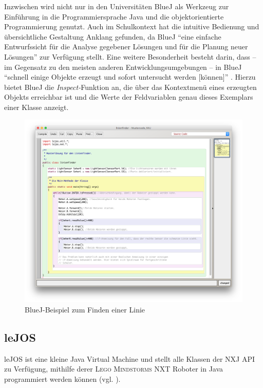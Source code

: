 \documentclass[paper=a4, DIV=calc, BCOR=12mm, twoside=on, onecolumn=on, open = right, titlepage =on, parskip =half-, headsepline = on, footsepline = off, chapterprefix = off, appendixprefix = on, fontsize = 12pt, numbers = noenddot, abstract = on]{scrbook}
\begin{document}
Inzwischen wird nicht nur in den Universitäten BlueJ als Werkzeug zur Einführung in die Programmiersprache Java und die objektorientierte Programmierung genutzt. Auch im Schulkontext hat die intuitive Bedienung und übersichtliche Gestaltung Anklang gefunden, da BlueJ "`eine einfache Entwurfssicht für die Analyse gegebener Lösungen und für die Planung neuer Lösungen"' \cite[S.6]{ehmann:09} zur Verfügung stellt. Eine weitere Besonderheit besteht darin, dass -- im Gegensatz zu den meisten anderen Entwicklungsumgebungen -- in BlueJ "`schnell einige Objekte erzeugt und sofort untersucht werden [können]"' \cite[S.6]{ehmann:09}. Hierzu bietet BlueJ die \emph{Inspect-}Funktion an, die über das Kontextmenü eines erzeugten Objekts erreichbar ist und die Werte der Feldvariablen genau dieses Exemplars einer Klasse anzeigt.

\begin{figure}[htb]
\centering
\includegraphics[width=\textwidth]{images/linienfinder_bluej.png} 
\caption{BlueJ-Beispiel zum Finden einer Linie}
\label{fig:Bsp BlueJ Linienfinder}
\end{figure}


\par \singlespacing
\subsection{leJOS}
\label{sec:lejos}
\onehalfspacing
leJOS ist eine kleine Java Virtual Machine und stellt alle Klassen der NXJ API zu Verfügung, mithilfe derer \textsc{Lego Mindstorms} NXT Roboter in Java programmiert werden können (vgl. \cite{lejos}).
\end{document}
